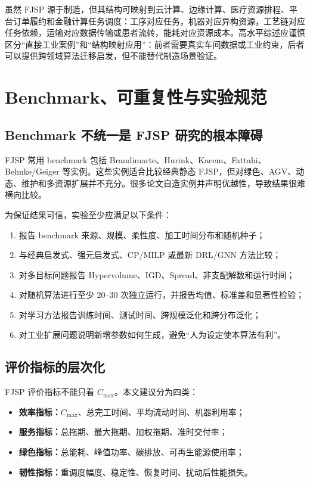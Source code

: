 \documentclass[UTF8,a4paper,11pt]{ctexart}
\newcommand{\Cmax}{C_{\max}}
\begin{document}
虽然 FJSP 源于制造，但其结构可映射到云计算、边缘计算、医疗资源排程、平台订单履约和金融计算任务调度：工序对应任务，机器对应异构资源，工艺链对应任务依赖，运输对应数据传输或患者流转，能耗对应资源成本。高水平综述应谨慎区分“直接工业案例”和“结构映射应用”：前者需要真实车间数据或工业约束，后者可以提供跨领域算法迁移启发，但不能替代制造场景验证。

\section{Benchmark、可重复性与实验规范}

\subsection{Benchmark 不统一是 FJSP 研究的根本障碍}

FJSP 常用 benchmark 包括 Brandimarte、Hurink、Kacem、Fattahi、Behnke/Geiger 等实例\cite{Brandimarte1993,Hurink1994,Kacem2002,Fattahi2007,Behnke2012}。这些实例适合比较经典静态 FJSP，但对绿色、AGV、动态、维护和多资源扩展并不充分。很多论文自造实例并声明优越性，导致结果很难横向比较。

为保证结果可信，实验至少应满足以下条件：
\begin{enumerate}
    \item 报告 benchmark 来源、规模、柔性度、加工时间分布和随机种子；
    \item 与经典启发式、强元启发式、CP/MILP 或最新 DRL/GNN 方法比较；
    \item 对多目标问题报告 Hypervolume、IGD、Spread、非支配解数和运行时间；
    \item 对随机算法进行至少 20--30 次独立运行，并报告均值、标准差和显著性检验；
    \item 对学习方法报告训练时间、测试时间、跨规模泛化和跨分布泛化；
    \item 对工业扩展问题说明新增参数如何生成，避免“人为设定使本算法有利”。
\end{enumerate}

\subsection{评价指标的层次化}

FJSP 评价指标不能只看 $\Cmax$。本文建议分为四类：
\begin{itemize}
    \item \textbf{效率指标：}$\Cmax$、总完工时间、平均流动时间、机器利用率；
    \item \textbf{服务指标：}总拖期、最大拖期、加权拖期、准时交付率；
    \item \textbf{绿色指标：}总能耗、峰值功率、碳排放、可再生能源使用率；
    \item \textbf{韧性指标：}重调度幅度、稳定性、恢复时间、扰动后性能损失。
\end{itemize}
\end{document}
